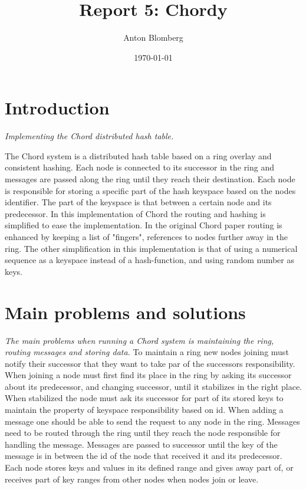 \documentclass[a4paper, 11pt]{article}
\title{Report 5: Chordy}
\author{Anton Blomberg}
\date{\today{}}
\begin{document}
\maketitle

\section{Introduction}

\textit{Implementing the Chord distributed hash table.}

The Chord system is a distributed hash table based on a ring overlay and consistent hashing. Each node is connected to its successor in the
ring and messages are passed along the ring until they reach their destination. Each node is responsible for storing a specific part of the
hash keyspace based on the nodes identifier. The part of the keyspace is that between a certain node and its predecessor.
In this implementation of Chord the routing and hashing is simplified to ease the implementation. In the original Chord paper routing is
enhanced by keeping a list of "fingers", references to nodes further away in the ring. The other simplification in this implementation
is that of using a numerical sequence as a keyspace instead of a hash-function, and using random number as keys.

\section{Main problems and solutions}

\textit{The main problems when running a Chord system is maintaining the ring, routing messages and storing data.}
To maintain a ring new nodes joining must notify their successor that they want to take par of the successors responsibility. When joining
a node must first find its place in the ring by asking its successor about its predecessor, and changing successor, until it stabilizes
in the right place. When stabilized the node must ask its successor for part of its stored keys to maintain the property of keyspace
responsibility based on id.
When adding a message one should be able to send the request to any node in the ring. Messages need to be routed through the ring until they
reach the node responsible for handling the message. Messages are passed to successor until the key of the message is in between the id of
the node that received it and its predecessor. Each node stores keys and values in its defined range and gives away part of, or receives part
of key ranges from other nodes when nodes join or leave.
\end{document}

